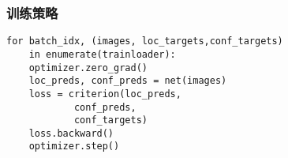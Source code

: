 \subsubsection{训练策略}
\begin{lstlisting}[caption={训练方法}]
for batch_idx, (images, loc_targets,conf_targets) 
	in enumerate(trainloader):
	optimizer.zero_grad()
	loc_preds, conf_preds = net(images)
	loss = criterion(loc_preds,
			conf_preds,
			conf_targets)
	loss.backward()
	optimizer.step()
\end{lstlisting}
